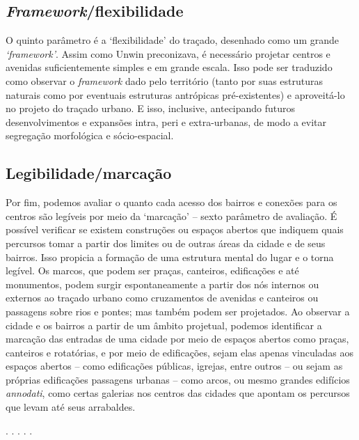 \documentclass[12pt, a4paper]{book} %
\begin{document}
                \subsection*{\textit{Framework}/flexibilidade}
        
        O quinto parâmetro é a `flexibilidade' do traçado, desenhado como um grande \textit{`framework'}. Assim como Unwin preconizava, é necessário projetar centros e avenidas suficientemente simples e em grande escala. Isso pode ser traduzido como observar o \textit{framework} dado pelo território (tanto por suas estruturas naturais como por eventuais estruturas antrópicas pré-existentes) e aproveitá-lo no projeto do traçado urbano. E isso, inclusive, antecipando futuros desenvolvimentos e expansões intra, peri e extra-urbanas, de modo a evitar segregação morfológica e sócio-espacial.

                \subsection*{Legibilidade/marcação}

        Por fim, podemos avaliar o quanto cada acesso dos bairros e conexões para os centros são legíveis por meio da ‘marcação’ – sexto parâmetro de avaliação. É possível verificar se existem construções ou espaços abertos que indiquem quais percursos tomar a partir dos limites ou de outras áreas da cidade e de seus bairros. Isso propicia a formação de uma estrutura mental do lugar e o torna legível. Os marcos, que podem ser praças, canteiros, edificações e até monumentos, podem surgir espontaneamente a partir dos nós internos ou externos ao traçado urbano como cruzamentos de avenidas e canteiros ou passagens sobre rios e pontes; mas também podem ser projetados. Ao observar a cidade e os bairros a partir de um âmbito projetual, podemos identificar a marcação das entradas de uma cidade por meio de espaços abertos como praças, canteiros e rotatórias, e por meio de edificações, sejam elas apenas vinculadas aos espaços abertos – como edificações públicas, igrejas, entre outros – ou sejam as próprias edificações passagens urbanas – como arcos, ou mesmo grandes edifícios \textit{annodati}, como certas galerias nos centros das cidades que apontam os percursos que levam até seus arrabaldes.



        \begin{center}
            . . . . .
        \end{center}  
\end{document}
